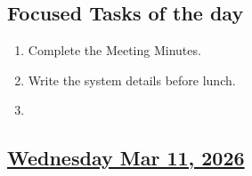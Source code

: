 \subsection*{Focused Tasks of the day}
\begin{enumerate}[\ding{212}]  
    \item Complete the Meeting Minutes. 
    \item Write the system details before lunch. \xmark
    \item 
\end{enumerate}
\subsection*{\underline{Wednesday Mar 11, 2026} }

